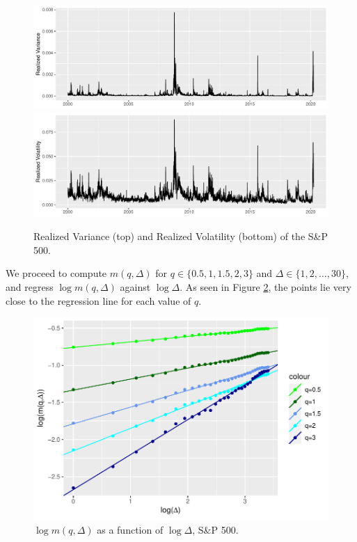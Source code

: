 \begin{figure}[H]
    \centering
    \includegraphics[scale=0.6]{fig/img/RealizedLib/realized_variance_longplot.pdf}
    \includegraphics[scale=0.6]{fig/img/RealizedLib/realized_volatility_longplot.pdf}
    \caption{Realized Variance (top) and Realized Volatility (bottom) of the S\&P 500.}
    \label{fig:realized}
\end{figure}
We proceed to compute $m(q,\Delta)$ for $q\in \{0.5,1,1.5,2,3\}$ and $\Delta \in \{1,2,\dots,30\}$, and regress $\log m(q,\Delta)$ against $\log\Delta$. As seen in Figure \ref{fig: Linear_reg}, the points lie very close to the regression line for each value of $q$.
\begin{figure}[H]
    \centering
    \includegraphics[scale=0.8]{fig/img/RealizedLib/Linear_Reg_rigtig.pdf}
    \caption{$\log m(q,\Delta)$ as a function of $\log\Delta$, S\&P 500.}
    \label{fig: Linear_reg}
\end{figure}
